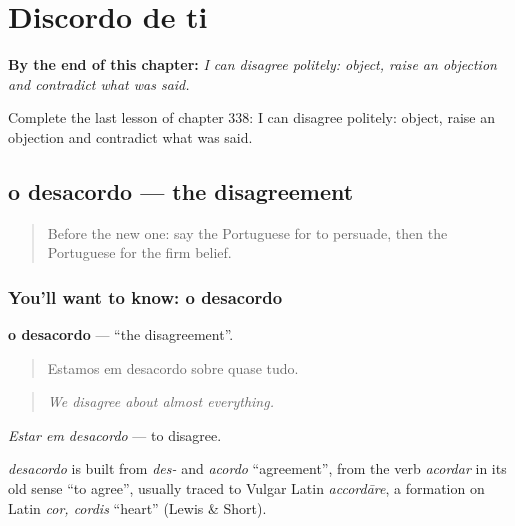 
\chapter{Discordo de ti}
\label{ch:pt-discordo-de-ti}

\begin{chapteropening}
\textbf{By the end of this chapter:} \emph{I can disagree politely: object, raise an objection and contradict what was said.}

Complete the last lesson of chapter 338: I can disagree politely: object, raise an objection and contradict what was said.
\end{chapteropening}

\section[o desacordo]{o desacordo — the disagreement}

\label{lesson:PT-C338-desacordo}



\begin{quote}
Before the new one: say the Portuguese for to persuade, then the Portuguese for the firm belief.
\end{quote}

\subsection*{You'll want to know: o desacordo}
\textbf{o desacordo} — \textquotedblleft{}the disagreement\textquotedblright{}.

\begin{quote}
Estamos em desacordo sobre quase tudo.
\end{quote}

\begin{quote}
\emph{We disagree about almost everything.}
\end{quote}

\emph{Estar em desacordo} — to disagree.

\begin{cousinweb}
\emph{desacordo} is built from \emph{des-} and \emph{acordo} \textquotedblleft{}agreement\textquotedblright{}, from the verb \emph{acordar} in its old sense \textquotedblleft{}to agree\textquotedblright{}, usually traced to Vulgar Latin \emph{accordāre}, a formation on Latin \emph{cor, cordis} \textquotedblleft{}heart\textquotedblright{} (Lewis \& Short).
\end{cousinweb}

